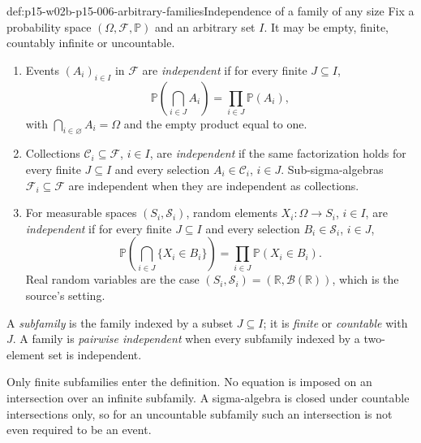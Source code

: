\begin{hbdefinition}{def:p15-w02b-p15-006-arbitrary-families}{Independence of a family of any size}
Fix a probability space \((\Omega,\mathcal F,\mathbb P)\) and an
arbitrary set \(I\). It may be empty, finite, countably infinite or
uncountable.
\begin{enumerate}
\item Events \((A_i)_{i\in I}\) in \(\mathcal F\) are
      \emph{independent} if for every finite \(J\subseteq I\),
      \[
       \mathbb P\left(\bigcap_{i\in J}A_i\right)
                              =\prod_{i\in J}\mathbb P(A_i),
      \]
      with \(\bigcap_{i\in\varnothing}A_i=\Omega\) and the empty
      product equal to one.
\item Collections \(\mathcal C_i\subseteq\mathcal F\), \(i\in I\), are
      \emph{independent} if the same factorization holds for every
      finite \(J\subseteq I\) and every selection
      \(A_i\in\mathcal C_i\), \(i\in J\). Sub-sigma-algebras
      \(\mathcal F_i\subseteq\mathcal F\) are independent when they are
      independent as collections.
\item For measurable spaces \((S_i,\mathcal S_i)\), random elements
      \(X_i:\Omega\to S_i\), \(i\in I\), are \emph{independent} if for
      every finite \(J\subseteq I\) and every selection
      \(B_i\in\mathcal S_i\), \(i\in J\),
      \[
       \mathbb P\left(\bigcap_{i\in J}\{X_i\in B_i\}\right)
                       =\prod_{i\in J}\mathbb P(X_i\in B_i).
      \]
      Real random variables are the case
      \((S_i,\mathcal S_i)=(\mathbb R,\mathcal B(\mathbb R))\),
      which is the source's setting.
\end{enumerate}
A \emph{subfamily} is the family indexed by a subset \(J\subseteq I\);
it is \emph{finite} or \emph{countable} with \(J\). A family is
\emph{pairwise independent} when every subfamily indexed by a
two-element set is independent.

Only finite subfamilies enter the definition. No equation is imposed
on an intersection over an infinite subfamily. A sigma-algebra is
closed under countable intersections only, so for an uncountable
subfamily such an intersection is not even required to be an event.
\end{hbdefinition}

